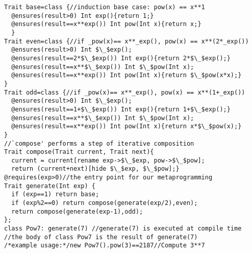 \vspace{-1ex}
\begin{lstlisting}[firstnumber=11]
Trait base=class {//induction base case: pow(x) == x**1
  @ensures(result>0) Int exp(){return 1;}  
  @ensures(result==x**exp()) Int pow(Int x){return x;}
  }
Trait even=class {//if _pow(x)== x**_exp(), pow(x) == x**(2*_exp())
  @ensures(result>0) Int $\_$exp();
  @ensures(result==2*$\_$exp()) Int exp(){return 2*$\_$exp();}
  @ensures(result==x**$\_$exp()) Int $\_$pow(Int x);
  @ensures(result==x**exp()) Int pow(Int x){return $\_$pow(x*x);}
}
Trait odd=class {//if _pow(x)== x**_exp(), pow(x) == x**(1+_exp())
  @ensures(result>0) Int $\_$exp();
  @ensures(result==1+$\_$exp()) Int exp(){return 1+$\_$exp();}
  @ensures(result==x**$\_$exp()) Int $\_$pow(Int x);
  @ensures(result==x**exp()) Int pow(Int x){return x*$\_$pow(x);}
}
//`compose' performs a step of iterative composition
Trait compose(Trait current, Trait next){
  current = current[rename exp->$\_$exp, pow->$\_$pow];
  return (current+next)[hide $\_$exp, $\_$pow];}
@requires(exp>0)//the entry point for our metaprogramming
Trait generate(Int exp) {
  if (exp==1) return base;
  if (exp%2==0) return compose(generate(exp/2),even);
  return compose(generate(exp-1),odd);
};
class Pow7: generate(7) //generate(7) is executed at compile time
//the body of class Pow7 is the result of generate(7)
/*example usage:*/new Pow7().pow(3)==2187//Compute 3**7
\end{lstlisting}
\vspace{-1ex}